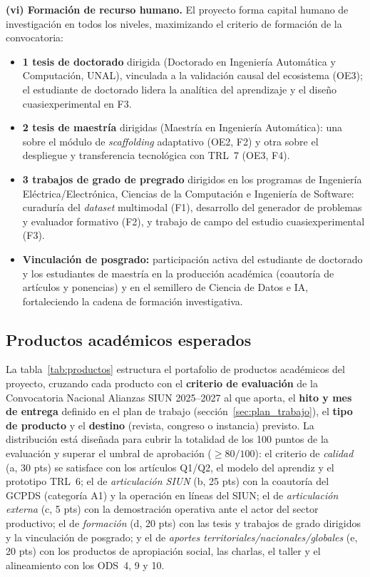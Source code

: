 \noindent\textbf{(vi) Formación de recurso humano.}
El proyecto forma capital humano de investigación en todos los niveles,
maximizando el criterio de formación de la convocatoria:
\begin{itemize}[leftmargin=*, itemsep=3pt]
    \item \textbf{1 tesis de doctorado} dirigida (Doctorado en Ingeniería
    Automática y Computación, UNAL), vinculada a la validación causal del
    ecosistema (OE3); el estudiante de doctorado lidera la analítica del
    aprendizaje y el diseño cuasiexperimental en F3.
    \item \textbf{2 tesis de maestría} dirigidas (Maestría en Ingeniería
    Automática): una sobre el módulo de \emph{scaffolding} adaptativo (OE2, F2)
    y otra sobre el despliegue y transferencia tecnológica con TRL~7 (OE3, F4).
    \item \textbf{3 trabajos de grado de pregrado} dirigidos en los programas de
    Ingeniería Eléctrica/Electrónica, Ciencias de la Computación e Ingeniería de
    Software: curaduría del \emph{dataset} multimodal (F1), desarrollo del
    generador de problemas y evaluador formativo (F2), y trabajo de campo del
    estudio cuasiexperimental (F3).
    \item \textbf{Vinculación de posgrado:} participación activa del estudiante
    de doctorado y los estudiantes de maestría en la producción académica
    (coautoría de artículos y ponencias) y en el semillero de Ciencia de Datos e
    IA, fortaleciendo la cadena de formación investigativa.
\end{itemize}

\medskip

\subsection{Productos académicos esperados}

La tabla~\ref{tab:productos} estructura el portafolio de productos académicos
del proyecto, cruzando cada producto con el \textbf{criterio de evaluación} de
la Convocatoria Nacional Alianzas SIUN 2025--2027 al que aporta, el
\textbf{hito y mes de entrega} definido en el plan de trabajo
(sección~\ref{sec:plan_trabajo}), el \textbf{tipo de producto} y el
\textbf{destino} (revista, congreso o instancia) previsto. La distribución está
diseñada para cubrir la totalidad de los 100 puntos de la evaluación y superar
el umbral de aprobación ($\geq 80/100$): el criterio de \emph{calidad} (a, 30
pts) se satisface con los artículos Q1/Q2, el modelo del aprendiz y el
prototipo TRL~6; el de \emph{articulación SIUN} (b, 25 pts) con la coautoría
del GCPDS (categoría A1) y la operación en líneas del SIUN; el de
\emph{articulación externa} (c, 5 pts) con la demostración operativa ante el
actor del sector productivo; el de \emph{formación} (d, 20 pts) con las tesis y
trabajos de grado dirigidos y la vinculación de posgrado; y el de \emph{aportes
territoriales/nacionales/globales} (e, 20 pts) con los productos de apropiación
social, las charlas, el taller y el alineamiento con los ODS~4, 9 y 10.

